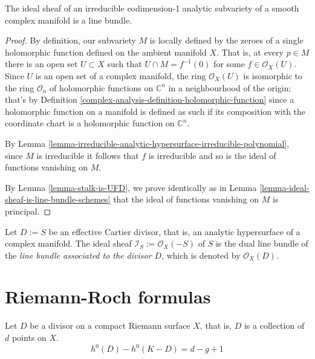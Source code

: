 \begin{lemma}
\label{lemma-ideal-sheaf-is-line-bundle-analytic-varieties}
The ideal sheaf of an irreducible codimension-1 analytic subvariety of a smooth
complex manifold is a line bundle.
\end{lemma}

\begin{proof}
By definition, our subvariety $M$ is locally defined by the zeroes of a single 
holomorphic function defined on the ambient manifold $X$. That is,
at every $p\in M$ there is an open set $U\subset X$ such that $U\cap
M=f^{-1}(0)$ for some $f\in\mathcal{O}_X(U)$. Since $U$ is an open set of a
complex manifold, the ring $\mathcal{O}_X(U)$ is isomorphic to the ring
$\mathcal{O}_n$ of holomorphic functions on $\mathbb{C}^n$ in a neighbourhood of
the origin; that's by Definition 
\ref{complex-analysis-definition-holomorphic-function} since a
holomorphic function on a manifold is defined as such if its composition with
the coordinate chart is a holomorphic function on $\mathbb{C}^n$.

By Lemma
\ref{lemma-irreducible-analytic-hypersurface-irreducible-polynomial}, since $M$
is irreducible it follows that $f$ is irreducible and so is the ideal of
functions vanishing on $M$.

By Lemma \ref{lemma-stalk-is-UFD}, we prove identically as in Lemma 
\ref{lemma-ideal-sheaf-is-line-bundle-schemes} that the ideal of functions
vanishing on $M$ is principal.
\end{proof}

\begin{definition}
\label{definition-sheaf-associated-to-effective-Cartier-divisor}
Let $D:=S$ be an effective Cartier divisor, that is, an analytic hypersurface of
a complex manifold. The ideal sheaf $\mathcal{I}_S:=\mathcal{O}_X(-S)$ of $S$ is
the dual line bundle of the {\it line bundle associated to the divisor $D$},
which is denoted by $\mathcal{O}_X(D)$.
\end{definition}

\section{Riemann-Roch formulas}
\label{section-Riemann-Roch}

\begin{theorem}
\label{theorem-Riemann-Roch-for-curves}
Let $D$ be a divisor on a compact Riemann surface $X$, that is, $D$ is a
collection of $d$ points on $X$.
\begin{equation}
\label{equation-Riemann-Roch-for-Riemann-surfaces}
h^0(D)-h^0(K-D)=d-g+1
\end{equation}
\end{theorem}

